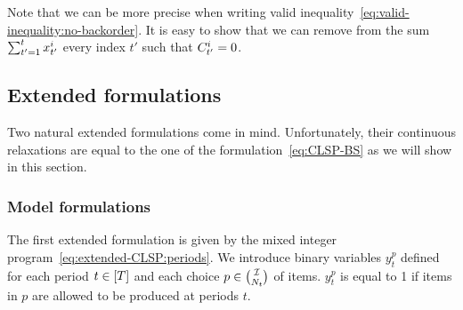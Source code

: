 Note that we can be more precise when writing valid inequality~\eqref{eq:valid-inequality:no-backorder}. It is easy to show that we can remove from the sum $\sum_{t'=1}^{t}x_{t'}^i$ every index $t'$ such that $C_{t'}^i=0$.





\subsection{Extended formulations}
\label{sec:PDP:deterministic:theoretical-results:extended-formulations}


Two natural extended formulations come in mind. Unfortunately, their continuous relaxations are equal to the one of the formulation~\eqref{eq:CLSP-BS} as we will show in this section.



\subsubsection{Model formulations}

The first extended formulation is given by the mixed integer program~\eqref{eq:extended-CLSP:periods}.
We introduce binary variables $y_t^p$ defined for each period $t\in\range{\horizon}$ and each choice $p\in{\mathcal{I}\choose N_t}$ of items.
$y_t^p$ is equal to 1 if items in $p$ are allowed to be produced at periods $t$.


